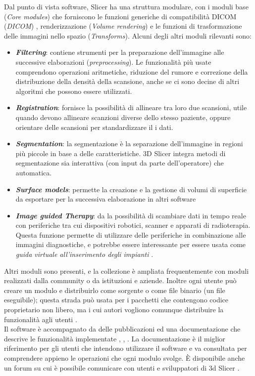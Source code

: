 Dal punto di vista software, Slicer ha una struttura modulare, con i moduli base (\emph{Core modules}) che forniscono le funzioni generiche di compatibilità DICOM (\emph{DICOM}) , renderizzazione (\emph{Volume rendering}) e le funzioni di trasformazione delle immagini nello spazio (\emph{Transforms}). Alcuni degli altri moduli rilevanti sono:
\begin{itemize}
\item \emph{\textbf{Filtering}}: contiene strumenti per la preparazione dell'immagine alle successive elaborazioni (\emph{preprocessing}). Le funzionalità più  usate comprendono operazioni aritmetiche, riduzione del rumore e correzione della distribuzione della densità della scansione, anche se ci sono decine di altri algoritmi che possono essere utilizzati.
\item \emph{\textbf{Registration}}: fornisce la possibilità di allineare tra loro due scansioni, utile quando devono allineare 	scanzioni diverse dello stesso paziente, oppure orientare delle scansioni per standardizzare il i dati.
\item \emph{\textbf{Segmentation}}: la segmentazione è la separazione dell'immagine in regioni più piccole in base a delle 	caratteristiche. 3D Slicer integra metodi di segmentazione sia interattiva (con input da parte 	dell'operatore) che automatica.
\item \emph{\textbf{Surface models}}: permette la creazione e la gestione di volumi di superficie da esportare per la successiva 	elaborazione in altri software
\item \emph{\textbf{Image guided Therapy}}: da la possibilità di scambiare dati in tempo reale con periferiche tra cui dispositivi 	robotici, scanner e apparati di radioterapia.
Questa funzione permette di utilizzare delle periferiche in combinazione alle immagini diagnostiche, e potrebbe essere interessante per essere usata come \emph{guida virtuale all'inserimento degli impianti} \parencite{Reference118}.
\end{itemize}
Altri moduli sono presenti, e la collezione è ampliata frequentemente con moduli realizzati dalla community o da istituzioni e aziende. Inoltre ogni utente può creare un modulo e distribuirlo come sorgente o come file binario (un file eseguibile); questa strada può usata per i pacchetti che contengono codice proprietario non libero, ma i cui autori vogliono comunque distribuire la funzionalità agli utenti \parencite{Reference28}.\\
Il software è accompagnato da delle pubblicazioni ed una documentazione che descrive le funzionalità implementate \parencite{Reference28}, \parencite{Reference29}, \parencite{Reference30}. La documentazione è il miglior riferimento per gli utenti che intendono utilizzare il software e va consultata per comprendere appieno le operazioni che ogni modulo svolge. È disponibile anche un forum su cui è possibile comunicare con utenti e sviluppatori di 3d Slicer \parencite{Reference35}.



